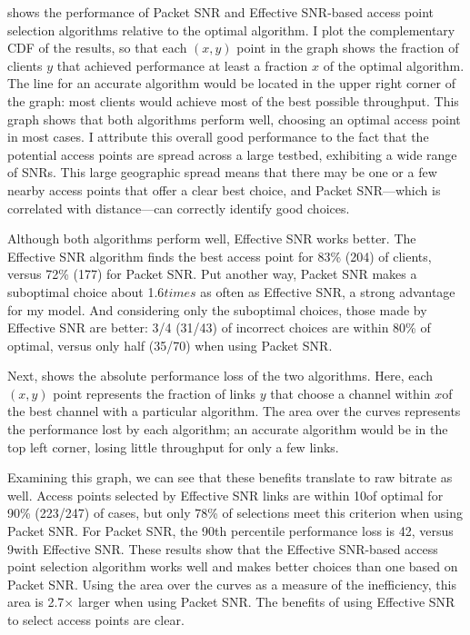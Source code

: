  shows the performance of Packet SNR and Effective SNR-based access point selection algorithms relative to the optimal algorithm. I plot the complementary CDF of the results, so that each $(x,y)$ point in the graph shows the fraction of clients $y$ that achieved performance at least a fraction $x$ of the optimal algorithm. The line for an accurate algorithm would be located in the upper right corner of the graph: most clients would achieve most of the best possible throughput.  This graph shows that both algorithms perform well, choosing an optimal access point in most cases. I attribute this overall good performance to the fact that the potential access points are spread across a large testbed, exhibiting a wide range of SNRs. This large geographic spread means that there may be one or a few nearby access points that offer a clear best choice, and Packet SNR---which is correlated with distance---can correctly identify good choices.

Although both algorithms perform well, Effective SNR works better. The Effective SNR algorithm finds the best access point for 83\% (204) of clients, versus 72\% (177) for Packet SNR. Put another way, Packet SNR makes a suboptimal choice about 1.6$times$ as often as Effective SNR, a strong advantage for my model. And considering only the suboptimal choices, those made by Effective SNR are better: 3/4 (31/43) of incorrect choices are within 80\% of optimal, versus only half (35/70) when using Packet SNR.

Next,  shows the absolute performance loss of the two algorithms. Here, each $(x,y)$ point represents the fraction of links $y$ that choose a channel within $x$\Mbps of the best channel with a particular algorithm. The area over the curves represents the performance lost by each algorithm; an accurate algorithm would be in the top left corner, losing little throughput for only a few links.

Examining this graph, we can see that these benefits translate to raw bitrate as well. Access points selected by Effective SNR links are within 10\Mbps of optimal for 90\% (223/247) of cases, but only 78\% of selections meet this criterion when using Packet SNR. For Packet SNR, the 90th percentile performance loss is 42\Mbps, versus 9\Mbps with Effective SNR. These results show that the Effective SNR-based access point selection algorithm works well and makes better choices than one based on Packet SNR. Using the area over the curves as a measure of the inefficiency, this area is 2.7$\times$ larger when using Packet SNR. The benefits of using Effective SNR to select access points are clear.

